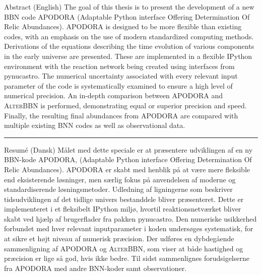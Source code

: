 \thispagestyle{chapter}

\begin{multiabstract}{Abstract (English)} 
\noindent The goal of this thesis is to present the development of a new BBN code APODORA (Adaptable Python interface Offering Determination Of Relic Abundances). APODORA is designed to be more flexible than existing codes, with an emphasis on the use of modern standardized computing methods. Derivations of the equations describing the time evolution of various components in the early universe are presented. These are implemented in a flexible IPython environment with the reaction network being created using interfaces from pynucastro\cite{pynucastro2}. The numerical uncertainty associated with every relevant input parameter of the code is systematically examined to ensure a high level of numerical precision. An in-depth comparison between APODORA and \textsc{AlterBBN} is performed, demonstrating equal or superior precision and speed. Finally, the resulting final abundances from APODORA are compared with multiple existing BNN codes as well as observational data.

\end{multiabstract}


\plainbreak{2}

\begin{multiabstract}{Resumé (Dansk)}
\noindent Målet med dette speciale er at præsentere udviklingen af en ny BBN-kode APODORA, (Adaptable Python interface Offering Determination Of Relic Abundances). APODORA er skabt med henblik på at være mere fleksible end eksisterende løsninger, men særlig fokus på anvendelsen af moderne og standardiserende løsningsmetoder. Udledning af ligningerne som beskriver tidsudviklingen af det tidlige univers bestanddele bliver præsenteret. Dette er implementeret i et fleksibelt IPython miljø, hvortil reaktionsnetværket bliver skabt ved hjælp af brugerflader fra pakken pynucastro\cite{pynucastro2}. Den numeriske usikkerhed forbundet med hver relevant inputparameter i koden undersøges systematisk, for at sikre et højt niveau af numerisk præcision. Der udføres en dybdegående sammenligning af APODORA og \textsc{AlterBBN}, som viser at både hastighed og præcision er lige så god, hvis ikke bedre. Til sidst sammenlignes forudsigelserne fra APODORA med andre BNN-koder samt observationer.

\end{multiabstract}

